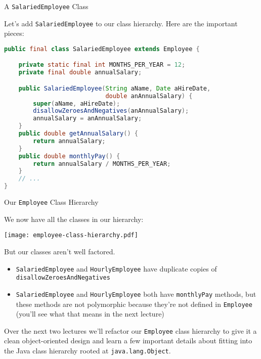 \documentclass{beamer}
\author[Chris Simpkins] 
{Christopher Simpkins \\\texttt{chris.simpkins@gatech.edu}}
\institute[Georgia Tech] %
\date[CS 1331]{}
\title[\course] %
{\lesson}
\subtitle{}
\begin{document}
\begin{frame}
  \titlepage
\end{frame}


\begin{frame}[fragile]{A {\tt SalariedEmployee} Class}


Let's add {\tt SalariedEmployee} to our class hierarchy.  Here are the important pieces:
\begin{lstlisting}[language=Java]
public final class SalariedEmployee extends Employee {

    private static final int MONTHS_PER_YEAR = 12;
    private final double annualSalary;

    public SalariedEmployee(String aName, Date aHireDate,
                            double anAnnualSalary) {
        super(aName, aHireDate);
        disallowZeroesAndNegatives(anAnnualSalary);
        annualSalary = anAnnualSalary;
    }
    public double getAnnualSalary() {
        return annualSalary;
    }
    public double monthlyPay() {
        return annualSalary / MONTHS_PER_YEAR;
    }
    // ...
}
\end{lstlisting}

\end{frame}

\begin{frame}[fragile]{Our {\tt Employee} Class Hierarchy}


We now have all the classes in our hierarchy:
\vspace{-.1in}
\begin{center}
\texttt{[image: employee-class-hierarchy.pdf]}
\end{center}
\vspace{-.2in}
But our classes aren't well factored.
\begin{itemize}
\item {\tt SalariedEmployee} and {\tt HourlyEmployee} have duplicate copies of {\tt disallowZeroesAndNegatives}
\item {\tt SalariedEmployee} and {\tt HourlyEmployee} both have {\tt monthlyPay} methods, but these methods are not polymorphic because they're not defined in {\tt Employee} (you'll see what that means in the next lecture)
\end{itemize}

Over the next two lectures we'll refactor our {\tt Employee} class hierarchy to give it a clean object-oriented design and learn a few important details about fitting into the Java class hierarchy rooted at {\tt java.lang.Object}.

\end{frame}
\end{document}
